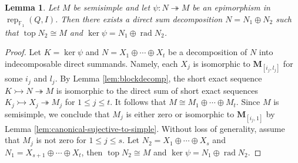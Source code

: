 \documentclass[12pt]{amsart}
\newtheorem{lemma}[theorem]{Lemma}
\theoremstyle{remark}
\theoremstyle{definition}
\numberwithin{equation}{section}
\newcommand{\opname}{\operatorname}
\begin{document}
\begin{lemma}\label{lem:semi-top-decompotion}
Let $M$ be  semisimple  and let $\psi:N\twoheadrightarrow M$ be an epimorphism in $\operatorname{rep}_{\mathbb{F}_1}(Q,I)$. Then there exists a direct sum decomposition $N=N_1\oplus N_2$ such that
$\operatorname{top} N_2\cong M$ and $\ker\psi=N_1\oplus \operatorname{rad} N_2$.
\end{lemma}
\begin{proof}
Let $K=\ker \psi$ and $N=X_1\oplus \cdots \oplus X_t$ be a decomposition of $N$ into indecomposable direct summands. Namely, each $X_j$ is isomorphic to $\mathbf{M}_{[i_j,l_j]}$ for some $i_j$ and $l_j$. By Lemma \ref{lem:blockdecomp}, the short exact sequence $K\rightarrowtail N\twoheadrightarrow M$ is isomorphic to the direct sum of short exact sequences $K_j\rightarrowtail X_j\twoheadrightarrow M_j$ for $1\leq j\leq t$. It follows that $M\cong M_1\oplus \cdots \oplus M_t$.
Since $M$ is semisimple,
we conclude that $M_j$ is either zero or isomorphic to $\mathbf{M}_{[i_j,1]}$ by Lemma \ref{lem:canonical-sujective-to-simple}. Without loss of generality, assume that $M_j$ is not zero for $1\leq j\leq s$. Let $N_2=X_1\oplus \cdots \oplus X_s$ and $N_1=X_{s+1}\oplus \cdots\oplus X_t$, then $\opname{top} N_2\cong M$ and $\ker \psi=N_1\oplus \opname{rad} N_2$.
\end{proof}
\end{document}
